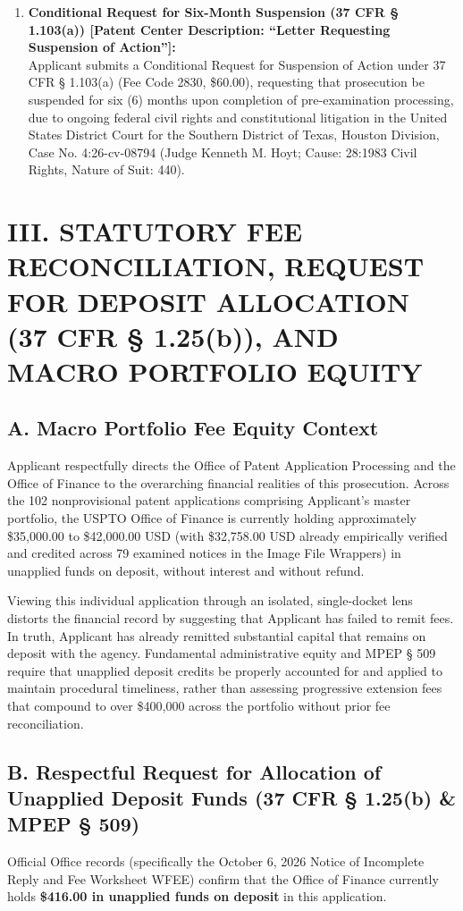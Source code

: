 \documentclass[11pt,letterpaper]{article}
\begin{document}
\begin{enumerate}[leftmargin=*]
    \item \textbf{Conditional Request for Six-Month Suspension (37 CFR \S{} 1.103(a)) [Patent Center Description: ``Letter Requesting Suspension of Action'']:} \\
    Applicant submits a Conditional Request for Suspension of Action under 37 CFR \S{} 1.103(a) (Fee Code 2830, \$60.00), requesting that prosecution be suspended for six (6) months upon completion of pre-examination processing, due to ongoing federal civil rights and constitutional litigation in the United States District Court for the Southern District of Texas, Houston Division, Case No. 4:26-cv-08794 (Judge Kenneth M. Hoyt; Cause: 28:1983 Civil Rights, Nature of Suit: 440).
\end{enumerate}

\section*{III. STATUTORY FEE RECONCILIATION, REQUEST FOR DEPOSIT ALLOCATION (37 CFR \S{} 1.25(b)), AND MACRO PORTFOLIO EQUITY}

\subsection*{A. Macro Portfolio Fee Equity Context}
Applicant respectfully directs the Office of Patent Application Processing and the Office of Finance to the overarching financial realities of this prosecution. Across the 102 nonprovisional patent applications comprising Applicant's master portfolio, the USPTO Office of Finance is currently holding approximately \$35,000.00 to \$42,000.00 USD (with \$32,758.00 USD already empirically verified and credited across 79 examined notices in the Image File Wrappers) in unapplied funds on deposit, without interest and without refund.

Viewing this individual application through an isolated, single-docket lens distorts the financial record by suggesting that Applicant has failed to remit fees. In truth, Applicant has already remitted substantial capital that remains on deposit with the agency. Fundamental administrative equity and MPEP \S{} 509 require that unapplied deposit credits be properly accounted for and applied to maintain procedural timeliness, rather than assessing progressive extension fees that compound to over \$400,000 across the portfolio without prior fee reconciliation.

\subsection*{B. Respectful Request for Allocation of Unapplied Deposit Funds (37 CFR \S{} 1.25(b) \& MPEP \S{} 509)}
Official Office records (specifically the October 6, 2026 Notice of Incomplete Reply and Fee Worksheet WFEE) confirm that the Office of Finance currently holds \textbf{\$416.00 in unapplied funds on deposit} in this application.
\end{document}
